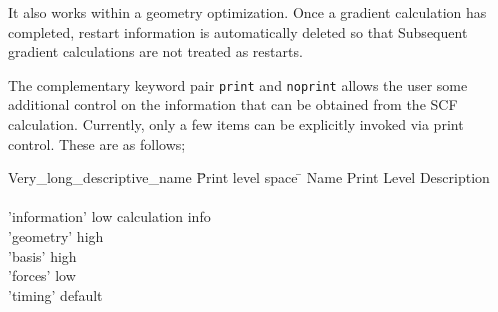 
  It also works within a geometry optimization. Once a gradient
calculation has completed, restart information is automatically
deleted
so that Subsequent gradient 
  calculations are not treated as restarts.


The complementary keyword pair \verb+print+ and \verb+noprint+ allows the 
user some additional control on the information that can be obtained from
the SCF calculation.  Currently, only a few items can be explicitly invoked
via print control.  These are as follows;
 

\begin{tabbing}
  Very\_long\_descriptive\_name \= Print level space \= \kill
  Name                   \> Print Level \> Description \\
                         \>        \> \\
        'information'   \>        low  \> calculation info\\
        'geometry'    \>          high \> \\
        'basis'        \>         high \> \\
        'forces'   \>             low \> \\
        'timing'   \>             default \> 
\end{tabbing}


